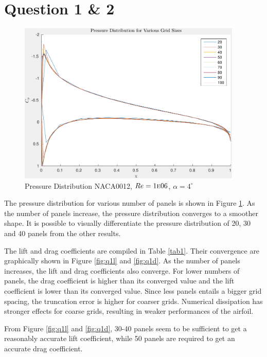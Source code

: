 \documentclass[letterpaper,12pt,]{article}
\begin{document}


\section*{Question 1 \& 2}

\begin{figure}[!h]
    \centering
    \includegraphics[width = 0.95\textwidth]{./figures/q1pressure.pdf}
    \caption{Pressure Distribution NACA0012, $Re = 1\textsc{e}06$, $\alpha = 4^{\circ}$}
    \label{fig:q1p}
\end{figure}

The pressure distribution for various number of panels is shown in Figure \ref{fig:q1p}.
As the number of panels increase, the pressure distribution converges to a smoother shape.
It is possible to visually differentiate the pressure distribution of 20, 30 and 40 panels from the other results.

The lift and drag coefficients are compiled in Table \ref{tab1}.
Their convergence are graphically shown in Figure \ref{fig:q1l} and \ref{fig:q1d}.
As the number of panels increases, the lift and drag coefficients also converge.
For lower numbers of panels, the drag coefficient is higher than its converged value and the lift coefficient is lower than its converged value.
Since less panels entails a bigger grid spacing, the truncation error is higher for coarser grids.
Numerical dissipation has stronger effects for coarse grids, resulting in weaker performances of the airfoil.

From Figure \ref{fig:q1l} and \ref{fig:q1d}, 30-40 panels seem to be sufficient to get a reasonably accurate lift coefficient, while 50 panels are required to get an accurate drag coefficient.
\end{document}
